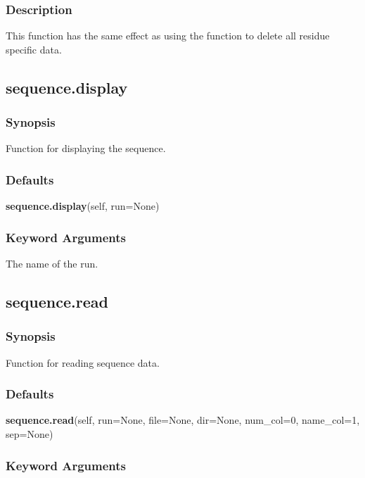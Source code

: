 \subsubsection{Description}

This function has the same effect as using the 
 function to delete  all residue
specific data.


\newpage

\subsection{sequence.display}


\subsubsection{Synopsis}

Function for displaying the sequence.

\subsubsection{Defaults}

\textsf{\textbf{sequence.display}(self, run=None)}


\subsubsection{Keyword Arguments}


  The name of the run.


\newpage

\subsection{sequence.read}


\subsubsection{Synopsis}

Function for reading sequence data.

\subsubsection{Defaults}

\textsf{\textbf{sequence.read}(self, run=None, file=None, dir=None, num\_col=0, name\_col=1, sep=None)}


\subsubsection{Keyword Arguments}


